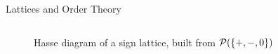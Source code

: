 \documentclass[aspectratio=169,notes]{beamer}
\begin{document}
\begin{frame}{Lattices and Order Theory}
\begin{columns}[T]
\begin{column}{0.4\textwidth}
\begin{figure}[h]
    \caption{\footnotesize Hasse diagram of a sign lattice, built from $\operatorname{\mathcal{P}}(\{+,-,0\})$}
  \end{figure}
  \end{column}
  \end{columns}
\end{frame}
\endgroup %
\end{document}
